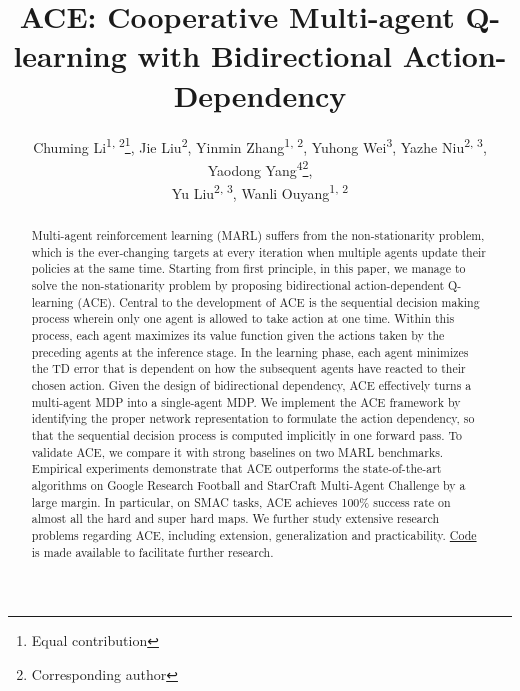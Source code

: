 \documentclass[letterpaper]{article} \usepackage{aaai23}  \usepackage{times}  \usepackage{helvet}  \usepackage{courier}  \usepackage[hyphens]{url}  \usepackage{graphicx} \urlstyle{rm} \def\UrlFont{\rm}  \usepackage{natbib}  \usepackage{caption} \frenchspacing  \setlength{\pdfpagewidth}{8.5in} \setlength{\pdfpageheight}{11in} \usepackage{algorithm}
\title{ACE: Cooperative Multi-agent Q-learning with 
Bidirectional Action-Dependency}
\author {
    Chuming Li\textsuperscript{\rm 1, 2}\thanks{Equal contribution},
    Jie Liu\textsuperscript{\rm 2}\samethanks, 
    Yinmin Zhang\textsuperscript{\rm 1, 2}\samethanks,
    Yuhong Wei\textsuperscript{\rm 3}, 
    Yazhe Niu\textsuperscript{\rm 2, 3}, 
    Yaodong Yang\textsuperscript{\rm 4}\thanks{Corresponding author}, \\
    Yu Liu\textsuperscript{\rm 2, 3}\samethanks, 
    Wanli Ouyang\textsuperscript{\rm 1, 2}
}
\begin{document}
\maketitle

\begin{abstract}


Multi-agent reinforcement learning (MARL) suffers from the non-stationarity problem, which is the ever-changing targets at every iteration when multiple agents update their policies at the same time. Starting from first principle, in this paper, we manage to solve the non-stationarity problem by proposing bidirectional action-dependent Q-learning (ACE). 
Central to the development of ACE is the sequential decision making process wherein only one agent is allowed to take action at one time.
Within this process, each agent maximizes its value function given the actions taken by the preceding agents at the inference stage.  
In the learning phase, each agent minimizes the TD error that is dependent on how the subsequent agents have reacted to their chosen action. 
Given the design of bidirectional dependency, ACE effectively turns a multi-agent MDP into a single-agent MDP.
We implement the ACE framework by identifying the proper network representation to formulate the action dependency, so that the sequential decision process is computed implicitly in one forward pass. 
To validate ACE, we compare it with strong baselines on two  MARL benchmarks. 
Empirical experiments demonstrate that ACE outperforms the state-of-the-art algorithms on Google Research Football and StarCraft Multi-Agent Challenge by a large margin. 
In particular, on SMAC tasks, ACE achieves 100\% success rate on almost all the hard and super hard maps.
We further study extensive research problems regarding ACE, including extension, generalization and practicability. \href{https://github.com/opendilab/ACE}{Code} is made available to facilitate further research.


\end{abstract}
\end{document}
